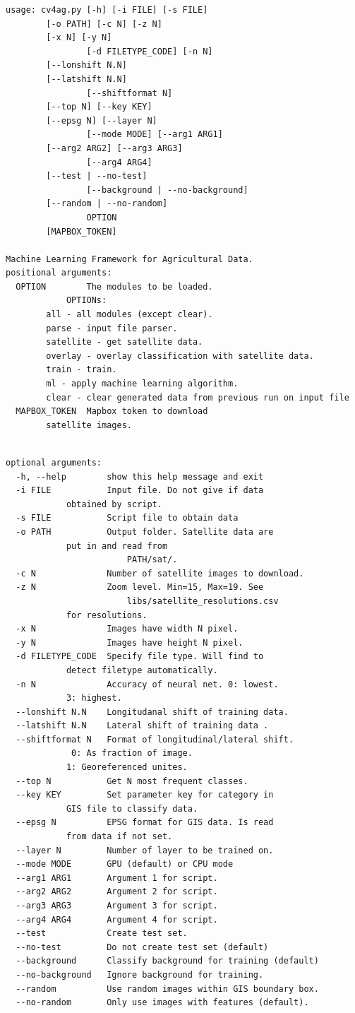 \documentclass[fleqn,10pt]{SelfArx} %
\begin{document}
\begin{lstlisting}
usage: cv4ag.py [-h] [-i FILE] [-s FILE]
		[-o PATH] [-c N] [-z N]
		[-x N] [-y N]
                [-d FILETYPE_CODE] [-n N]
		[--lonshift N.N]
		[--latshift N.N]
                [--shiftformat N]
		[--top N] [--key KEY] 
		[--epsg N] [--layer N]
                [--mode MODE] [--arg1 ARG1] 
		[--arg2 ARG2] [--arg3 ARG3]
                [--arg4 ARG4] 
		[--test | --no-test]
                [--background | --no-background] 
		[--random | --no-random]
                OPTION 
		[MAPBOX_TOKEN]

Machine Learning Framework for Agricultural Data.
positional arguments:
  OPTION        The modules to be loaded.
	        OPTIONs:
		all - all modules (except clear). 
		parse - input file parser. 
		satellite - get satellite data. 
		overlay - overlay classification with satellite data. 
		train - train. 
		ml - apply machine learning algorithm. 
		clear - clear generated data from previous run on input file
  MAPBOX_TOKEN  Mapbox token to download 
		satellite images.
\end{lstlisting}
\newpage\phantom{a}\newpage
\begin{lstlisting}

optional arguments:
  -h, --help        show this help message and exit
  -i FILE           Input file. Do not give if data 
			obtained by script.
  -s FILE           Script file to obtain data
  -o PATH           Output folder. Satellite data are 
			put in and read from
                    	PATH/sat/.
  -c N              Number of satellite images to download.
  -z N              Zoom level. Min=15, Max=19. See
                    	libs/satellite_resolutions.csv 
			for resolutions.
  -x N              Images have width N pixel.
  -y N              Images have height N pixel.
  -d FILETYPE_CODE  Specify file type. Will find to 
			detect filetype automatically. 
  -n N              Accuracy of neural net. 0: lowest. 
			3: highest.
  --lonshift N.N    Longitudanal shift of training data.
  --latshift N.N    Lateral shift of training data .
  --shiftformat N   Format of longitudinal/lateral shift.
			 0: As fraction of image. 
			1: Georeferenced unites.
  --top N           Get N most frequent classes.
  --key KEY         Set parameter key for category in 
			GIS file to classify data.
  --epsg N          EPSG format for GIS data. Is read 
			from data if not set.
  --layer N         Number of layer to be trained on.
  --mode MODE       GPU (default) or CPU mode
  --arg1 ARG1       Argument 1 for script.
  --arg2 ARG2       Argument 2 for script.
  --arg3 ARG3       Argument 3 for script.
  --arg4 ARG4       Argument 4 for script.
  --test            Create test set.
  --no-test         Do not create test set (default)
  --background      Classify background for training (default)
  --no-background   Ignore background for training.
  --random          Use random images within GIS boundary box.
  --no-random       Only use images with features (default).
\end{lstlisting}
\end{document}
